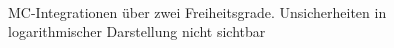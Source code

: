 \begin{figure}[tb!]
	\centering
	 \\
	\caption{MC-Integrationen über zwei Freiheitsgrade. Unsicherheiten in logarithmischer Darstellung nicht sichtbar}
	\label{MC-Int-Hadron}
\end{figure} %
